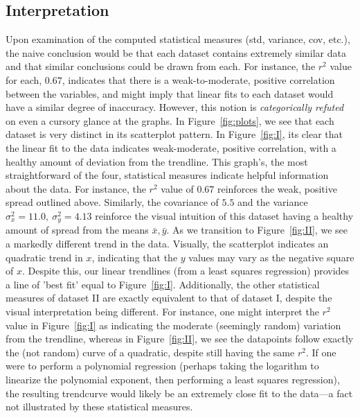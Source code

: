 \documentclass[11pt,a4paper]{article}
\begin{document}
\subsection{Interpretation}

Upon examination of the computed statistical measures (std, variance, cov, etc.), the naive conclusion would be that each dataset contains extremely similar data and that similar conclusions could be drawn from each. For instance, the $r^2$ value for each, $0.67$, indicates that there is a weak-to-moderate, positive correlation between the variables, and might imply that linear fits to each dataset would have a similar degree of inaccuracy. However, this notion is \textit{categorically refuted} on even a cursory glance at the graphs. In Figure~\ref{fig:plots}, we see that each dataset is very distinct in its scatterplot pattern. In Figure~\ref{fig:I}, its clear that the linear fit to the data indicates weak-moderate, positive correlation, with a healthy amount of deviation from the trendline. This graph's, the most straightforward of the four, statistical measures indicate helpful information about the data. For instance, the $r^2$ value of $0.67$ reinforces the weak, positive spread outlined above. Similarly, the covariance of $5.5$ and the variance $\sigma_x^2 = 11.0,\ \sigma_y^2 = 4.13$ reinforce the visual intuition of this dataset having a healthy amount of spread from the means $\bar{x}, \bar{y}$. 
As we transition to Figure~\ref{fig:II}, we see a markedly different trend in the data. Visually, the scatterplot indicates an quadratic trend in $x$, indicating that the $y$ values may vary as the negative square of $x$. Despite this, our linear trendlines (from a least squares regression) provides a line of 'best fit' equal to Figure~\ref{fig:I}. Additionally, the other statistical measures of dataset II are exactly equivalent to that of dataset I, despite the visual interpretation being different. For instance, one might interpret the $r^2$ value in Figure~\ref{fig:I} as indicating the moderate (seemingly random) variation from the trendline, whereas in Figure~\ref{fig:II}, we see the datapoints follow exactly the (not random) curve of a quadratic, despite still having the same $r^2$. If one were to perform a polynomial regression (perhaps taking the logarithm to linearize the polynomial exponent, then performing a least squares regression), the resulting trendcurve would likely be an extremely close fit to the data---a fact not illustrated by these statistical measures. 
\end{document}
